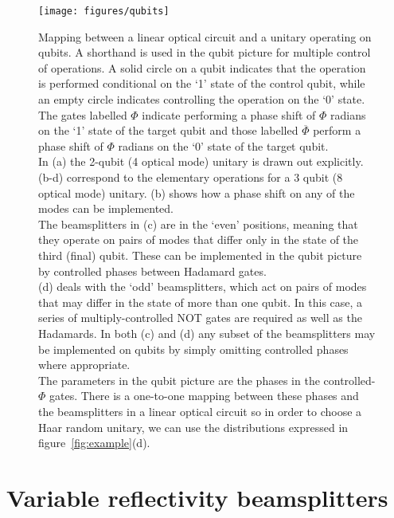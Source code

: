 \begin{figure}[p]
  \texttt{[image: figures/qubits]}
  \caption[Mapping between a linear optical circuit and a unitary operating on
    qubits]
    {Mapping between a linear optical circuit and a unitary operating on
    qubits. A shorthand is used in the qubit picture for multiple control of
    operations. A solid circle on a qubit indicates that the operation is
    performed conditional on the `1' state of the control qubit, while an empty
    circle indicates controlling the operation on the `0' state. The gates
    labelled \(\Phi\) indicate performing a phase shift of \(\Phi\) radians on
    the `1' state of the target qubit and those labelled \(\overline{\Phi}\)
    perform a phase shift of \(\Phi\) radians on the `0' state of the target
    qubit. \\
    In (a) the 2-qubit (4 optical mode) unitary is drawn out explicitly.
    (b-d) correspond to the elementary operations for a 3 qubit (8 optical mode)
    unitary. (b) shows how a phase shift on any of the modes can be
    implemented. \\
    The beamsplitters in (c) are in the `even' positions, meaning that they
    operate on pairs of modes that differ only in the state of the third (final)
    qubit. These can be implemented in the qubit picture by controlled phases
    between Hadamard gates. \\
    (d) deals with the `odd' beamsplitters, which act on
    pairs of modes that may differ in the state of more than one qubit. In this
    case, a series of multiply-controlled NOT gates are required as well as the
    Hadamards. In both (c) and (d) any subset of the beamsplitters may be
    implemented on qubits by simply omitting controlled phases where
    appropriate. \\
    The parameters in the qubit picture are the phases in the
    controlled-\(\Phi\)
    gates. There is a one-to-one mapping between these phases and the
    beamsplitters in a linear optical circuit so in order to
    choose a Haar random unitary, we can use the distributions expressed in
    figure~\ref{fig:example}(d).}
  \label{fig:qubits}
\end{figure}
  
\section{Variable reflectivity beamsplitters}
\label{sec:integrated}

